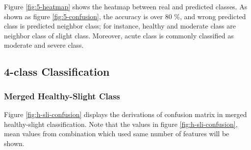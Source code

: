 \documentclass[aps, 11pt, a4paper]{article}
\begin{document}
    		Figure \ref{fig:5-heatmap} shows the heatmap between real and predicted classes. As shown as figure \ref{fig:5-confusion}, the accuracy is over 80 \%, and wrong predicted class is predicted neighbor class; for instance, healthy and moderate class are neighbor class of slight class. Moreover, acute class is commonly classified as moderate and severe class. 
    		
    	\subsection{4-class Classification}
    		\subsubsection{Merged Healthy-Slight Class}
    			Figure \ref{fig:h-sli-confusion} displays the derivations of confusion matrix in merged healthy-slight classification. Note that the values in figure \ref{fig:h-sli-confusion}, mean values from combination which used same number of features will be shown. 
    			
\end{document}
